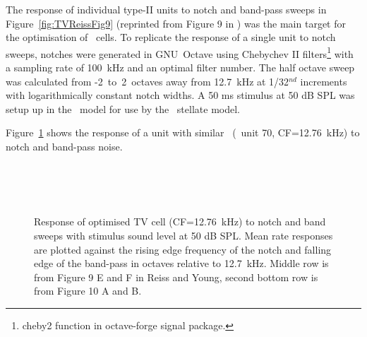 The response of individual type-II units to notch and band-pass sweeps in
Figure~\ref{fig:TVReissFig9} (reprinted from Figure 9 in
\citep*{ReissYoung:2005}) was the main target for the optimisation of \TV~cells.
To replicate the response of a single unit to notch sweeps, notches were
generated in GNU~Octave using Chebychev II filters\footnote{\textsf{cheby2} function
  in octave-forge signal package.}  with a sampling rate of 100~kHz and an
optimal filter number.  The half octave sweep was calculated from
-2~to~2~octaves away from 12.7~kHz at 1/32$^{nd}$ increments with
logarithmically constant notch widths\footnotemark. A 50 ms stimulus at 50 dB
SPL was setup up in the \AN~model for use by the \CN~stellate model.



Figure~\ref{fig:TV_SweepUnit70} shows the response of a unit with similar
\CF~(\TV~unit 70, CF=12.76~kHz) to notch and band-pass noise.

\begin{figure}[htb]
  \centering
  \\
  \\
  \\
  \caption[Response of optimised TV cell (CF=12.76~kHz) to notch and band
  sweeps]{Response of optimised TV cell (CF=12.76~kHz) to notch and band sweeps
    with stimulus sound level at 50 dB SPL\@. Mean rate responses are plotted
    against the rising edge frequency of the notch and falling edge of the
    band-pass in octaves relative to 12.7~kHz. Middle row is from Figure 9 E and
    F in Reiss and Young, second bottom row is from Figure 10 A and B. }
  \label{fig:TV_SweepUnit70}
\end{figure}





